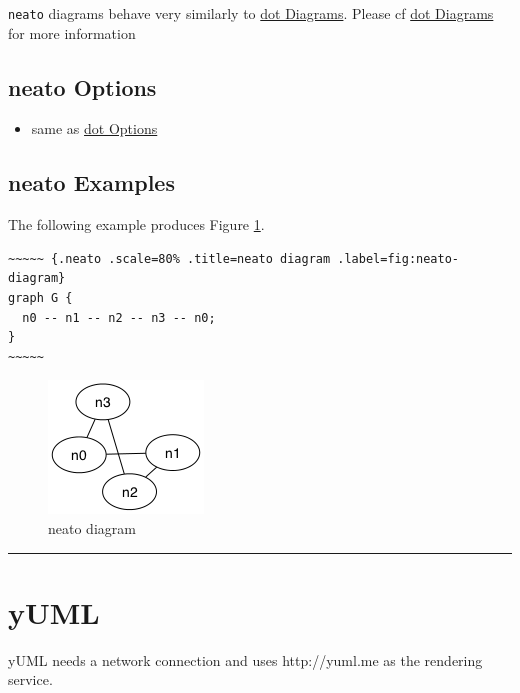 \documentclass[]{article}
\begin{document}
\texttt{neato} diagrams behave very similarly to
\hyperref[dot-diagrams]{dot Diagrams}. Please cf
\hyperref[dot-diagrams]{dot Diagrams} for more information

\subsection{neato Options}\label{neato-options}

\begin{itemize}
\itemsep1pt\parskip0pt
\item
  same as \hyperref[dot-options]{dot Options}
\end{itemize}

\subsection{neato Examples}\label{neato-examples}

The following example produces Figure \ref{fig:neato-diagram}.

\scriptsize

\begin{verbatim}
~~~~~ {.neato .scale=80% .title=neato diagram .label=fig:neato-diagram}
graph G {
  n0 -- n1 -- n2 -- n3 -- n0;
}
~~~~~
\end{verbatim}

\normalsize

\begin{figure}[htbp]
\centering
\includegraphics{tmp/ppp-render-_6_eB/image-5.png}
\caption{neato diagram\label{fig:neato-diagram}}
\end{figure}

\begin{center}\rule{3in}{0.4pt}\end{center}

\newpage

\section{yUML}\label{yuml}

yUML needs a network connection and uses http://yuml.me as the rendering
service.
\end{document}
